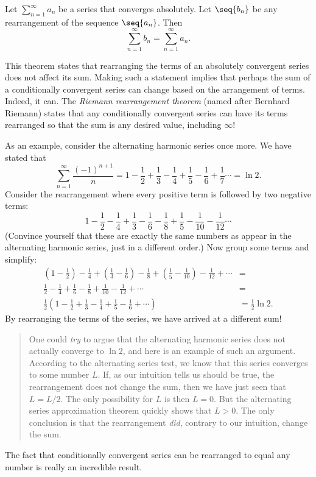 \documentclass{ximera}
\begin{document}
\begin{theorem}
  Let $\sum_{n=1}^\infty a_n$ be a series that converges absolutely.
  Let $\seq{b_n}$ be any rearrangement of the sequence
  $\seq{a_n}$. Then
  \[
  \sum_{n=1}^\infty b_n = \sum_{n=1}^\infty a_n.
  \]
\end{theorem}

This theorem states that rearranging the terms of an absolutely
convergent series does not affect its sum. Making such a statement implies that perhaps
the sum of a conditionally convergent series can change based on the
arrangement of terms. Indeed, it can. The \textit{Riemann
  rearrangement theorem} (named after Bernhard Riemann) states that
any conditionally convergent series can have its terms rearranged so
that the sum is any desired value, including $\infty$!


As an example, consider the alternating harmonic series once more. We
have stated that
\[
\sum_{n=1}^\infty \frac{(-1)^{n+1}}{n} =1-\frac12+\frac13-\frac14+\frac15-\frac16+\frac17\cdots = \ln 2.
\]
Consider the rearrangement where every positive term is followed by two negative terms:
\[
1-\frac12-\frac14+\frac13-\frac16-\frac18+\frac15-\frac1{10}-\frac1{12}\cdots
\]
(Convince yourself that these are exactly the same numbers as appear
in the alternating harmonic series, just in a different order.) Now
group some terms and simplify:
\begin{align*}
\left(1-\frac12\right)-\frac14+\left(\frac13-\frac16\right)-\frac18+\left(\frac15-\frac1{10}\right)-\frac1{12}+\cdots &= \\
\frac12-\frac14+\frac16-\frac18+\frac1{10}-\frac{1}{12}+\cdots &= \\
\frac12\left(1-\frac12+\frac13-\frac14+\frac15-\frac16+\cdots\right) & = \frac12\ln 2.
\end{align*}
By rearranging the terms of the series, we have arrived at a different
sum!
\begin{quote}
  One could \textit{try} to argue that the alternating harmonic series
  does not actually converge to $\ln 2$, and here is an example of such 
  an argument. According to the
  alternating series test, we know that this series converges to some number $L$. 
   If, as our intuition tells us should be true, the rearrangement does not change the sum,
  then we have just seen that $L = L/2$.  The only possibility for $L$ is then $L=0$. But the alternating series
  approximation theorem quickly shows that $L>0$. The only conclusion
  is that the rearrangement \textit{did}, contrary to our intuition, change the sum.
\end{quote}
The fact that conditionally convergent series can be rearranged to
equal any number is really an incredible result.
\end{document}
